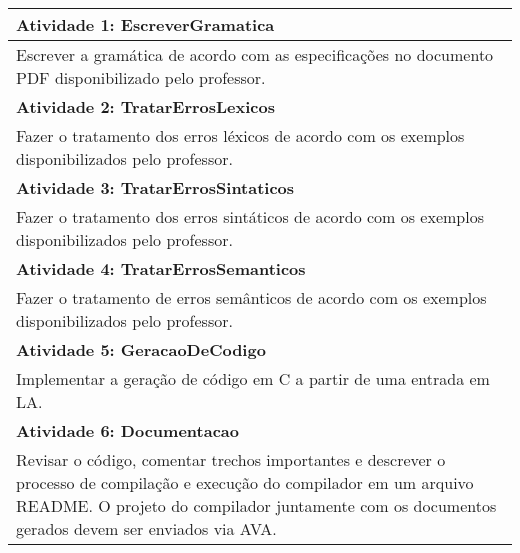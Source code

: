 \documentclass[a4paper,10pt]{article}
\newcommand{\myrowcolour}{\rowcolor[gray]{0.925}}
\begin{document}
\begin{longtable}{p{}}
	\toprule
	\myrowcolour
	\bfseries Atividade 1: EscreverGramatica                                                                 \\
	\midrule
	Escrever a gramática de acordo com as especificações no documento PDF disponibilizado pelo professor.
	\\

	\midrule
	\myrowcolour
	\bfseries Atividade 2: TratarErrosLexicos                                                                \\
	\midrule
	Fazer o tratamento dos erros léxicos de acordo com os exemplos disponibilizados pelo professor.
	\\

	\midrule
	\myrowcolour
	\bfseries Atividade 3: TratarErrosSintaticos                                                             \\
	\midrule
	Fazer o tratamento dos erros sintáticos de acordo com os exemplos disponibilizados pelo professor.
	\\

	\midrule
	\myrowcolour
	\bfseries Atividade 4: TratarErrosSemanticos                                                             \\
	\midrule
	Fazer o tratamento de erros semânticos de acordo com os exemplos disponibilizados pelo professor.
	\\

	\midrule
	\myrowcolour
	\bfseries Atividade 5: GeracaoDeCodigo                                                                   \\
	\midrule
	Implementar a geração de código em C a partir de uma entrada em LA.
    \\
    
    \midrule
	\myrowcolour
	\bfseries Atividade 6: Documentacao                                                                   \\
	\midrule
    Revisar o código, comentar trechos importantes e descrever o processo de compilação e execução do compilador em um arquivo README. O projeto do compilador juntamente com os documentos gerados devem ser
	enviados via AVA.
    \\

	\bottomrule
\end{longtable}

\newpage
\end{document}
